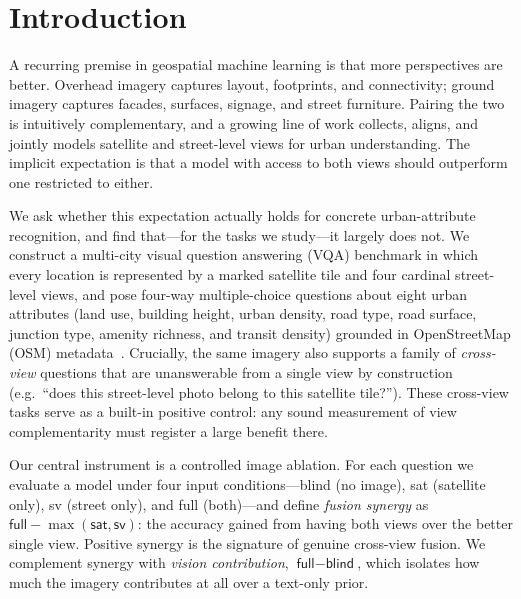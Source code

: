 \documentclass[runningheads]{llncs}
\begin{document}
\section{Introduction}
\label{sec:intro}

A recurring premise in geospatial machine learning is that more perspectives are
better. Overhead imagery captures layout, footprints, and connectivity; ground
imagery captures facades, surfaces, signage, and street furniture. Pairing the
two is intuitively complementary, and a growing line of work collects, aligns,
and jointly models satellite and street-level views for urban understanding.
The implicit expectation is that a model with access to both views should
outperform one restricted to either.

We ask whether this expectation actually holds for concrete urban-attribute
recognition, and find that---for the tasks we study---it largely does not. We
construct a multi-city visual question answering (VQA) benchmark in which every
location is represented by a marked satellite tile and four cardinal
street-level views, and pose four-way multiple-choice questions about eight
urban attributes (land use, building height, urban density, road type, road
surface, junction type, amenity richness, and transit density) grounded in
OpenStreetMap (OSM) metadata~\cite{osm}. Crucially, the same imagery also
supports a family of \emph{cross-view} questions that are unanswerable from a
single view by construction (e.g.\ ``does this street-level photo belong to this
satellite tile?''). These cross-view tasks serve as a built-in positive control:
any sound measurement of view complementarity must register a large benefit
there.

Our central instrument is a controlled image ablation. For each question we
evaluate a model under four input conditions---\textsf{blind} (no image),
\textsf{sat} (satellite only), \textsf{sv} (street only), and \textsf{full}
(both)---and define \emph{fusion synergy} as
$\textsf{full} - \max(\textsf{sat},\textsf{sv})$: the accuracy gained from having
both views over the better single view. Positive synergy is the signature of
genuine cross-view fusion. We complement synergy with \emph{vision contribution},
$\textsf{full} - \textsf{blind}$, which isolates how much the imagery
contributes at all over a text-only prior.
\end{document}
